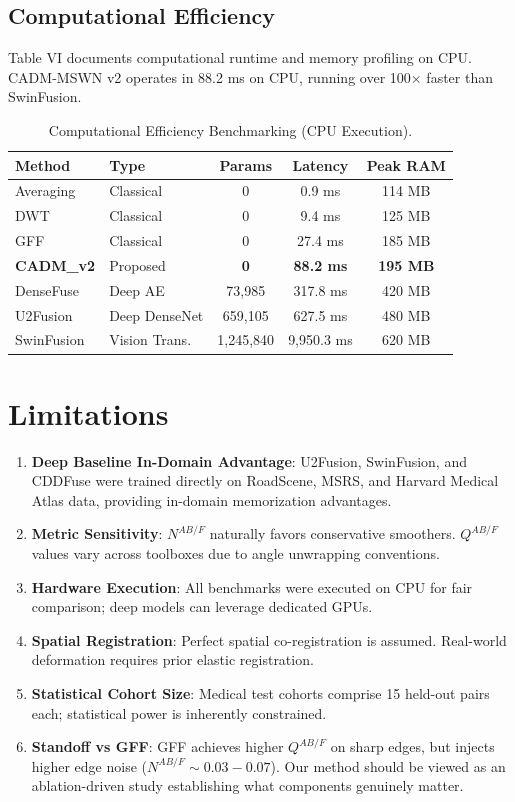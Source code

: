 \documentclass[conference]{IEEEtran}
\begin{document}
\subsection{Computational Efficiency}
Table VI documents computational runtime and memory profiling on CPU. CADM-MSWN v2 operates in 88.2 ms on CPU, running over 100$\times$ faster than SwinFusion.

\begin{table}[htbp]
\caption{Computational Efficiency Benchmarking (CPU Execution).}
\begin{center}
\begin{tabular}{llccc}
\toprule
\textbf{Method} & \textbf{Type} & \textbf{Params} & \textbf{Latency} & \textbf{Peak RAM} \\
\midrule
Averaging & Classical & 0 & 0.9 ms & 114 MB \\
DWT & Classical & 0 & 9.4 ms & 125 MB \\
GFF \cite{ref_gff} & Classical & 0 & 27.4 ms & 185 MB \\
\textbf{CADM\_v2} & Proposed & \textbf{0} & \textbf{88.2 ms} & \textbf{195 MB} \\
DenseFuse \cite{ref_densefuse} & Deep AE & 73,985 & 317.8 ms & 420 MB \\
U2Fusion \cite{ref_u2fusion} & Deep DenseNet & 659,105 & 627.5 ms & 480 MB \\
SwinFusion \cite{ref_swinfusion} & Vision Trans. & 1,245,840 & 9,950.3 ms & 620 MB \\
\bottomrule
\end{tabular}
\end{center}
\end{table}

\section{Limitations}
\begin{enumerate}
    \item \textbf{Deep Baseline In-Domain Advantage}: U2Fusion, SwinFusion, and CDDFuse were trained directly on RoadScene, MSRS, and Harvard Medical Atlas data, providing in-domain memorization advantages.
    \item \textbf{Metric Sensitivity}: $N^{AB/F}$ naturally favors conservative smoothers. $Q^{AB/F}$ values vary across toolboxes due to angle unwrapping conventions.
    \item \textbf{Hardware Execution}: All benchmarks were executed on CPU for fair comparison; deep models can leverage dedicated GPUs.
    \item \textbf{Spatial Registration}: Perfect spatial co-registration is assumed. Real-world deformation requires prior elastic registration.
    \item \textbf{Statistical Cohort Size}: Medical test cohorts comprise 15 held-out pairs each; statistical power is inherently constrained.
    \item \textbf{Standoff vs GFF}: GFF achieves higher $Q^{AB/F}$ on sharp edges, but injects higher edge noise ($N^{AB/F} \sim 0.03-0.07$). Our method should be viewed as an ablation-driven study establishing what components genuinely matter.
\end{enumerate}
\end{document}
